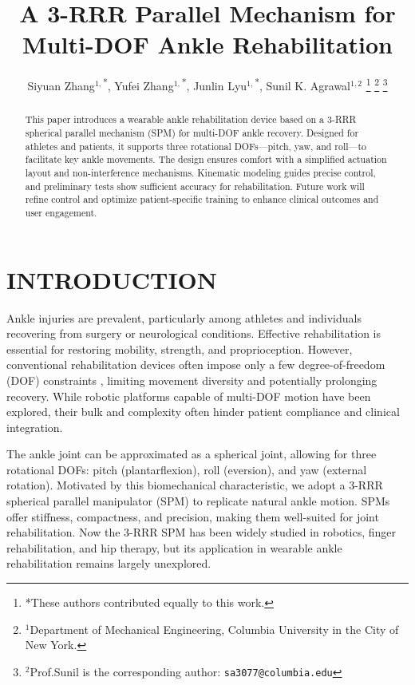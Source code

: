 \documentclass[letterpaper, 10 pt, conference]{ieeeconf}  %
\title{\LARGE \bf
A 3-RRR Parallel Mechanism for Multi-DOF Ankle Rehabilitation 
}
\author{Siyuan Zhang$^{1,}$\textsuperscript{*}, Yufei Zhang$^{1,}$\textsuperscript{*}, Junlin Lyu$^{1,}$\textsuperscript{*}, Sunil K. Agrawal$^{1, 2}$%
\thanks{*These authors contributed equally to this work.}%
\thanks{$^{1}$Department of Mechanical Engineering, 
        Columbia University in the City of New York.}%
\thanks{$^{2}$Prof.Sunil is the corresponding author: 
        {\tt\small sa3077@columbia.edu}}%
}
\begin{document}
\maketitle
\thispagestyle{empty}
\pagestyle{empty}


\begin{abstract}

This paper introduces a wearable ankle rehabilitation device based on a 3-RRR spherical parallel mechanism (SPM) for multi-DOF ankle recovery. Designed for athletes and patients, it supports three rotational DOFs—pitch, yaw, and roll—to facilitate key ankle movements. The design ensures comfort with a simplified actuation layout and non-interference mechanisms. Kinematic modeling guides precise control, and preliminary tests show sufficient accuracy for rehabilitation. Future work will refine control and optimize patient-specific training to enhance clinical outcomes and user engagement.

\end{abstract}


\section{INTRODUCTION}

Ankle injuries are prevalent, particularly among athletes and individuals recovering from surgery or neurological conditions. Effective rehabilitation is essential for restoring mobility, strength, and proprioception. However, conventional rehabilitation devices often impose only a few degree-of-freedom (DOF) constraints \cite{dong2021state}, limiting movement diversity and potentially prolonging recovery. While robotic platforms capable of multi-DOF motion have been explored, their bulk and complexity often hinder patient compliance and clinical integration.

The ankle joint can be approximated as a spherical joint, allowing for three rotational DOFs: pitch (plantarflexion), roll (eversion), and yaw (external rotation). Motivated by this biomechanical characteristic, we adopt a 3-RRR spherical parallel manipulator (SPM) to replicate natural ankle motion. SPMs offer stiffness, compactness, and precision, making them well-suited for joint rehabilitation. Now the 3-RRR SPM\cite{gosselin1989optimum} \cite{wu2019design} has been widely studied in robotics, finger rehabilitation\cite{he2021spindle}, and hip therapy\cite{sadeqi2017design}, but its application in wearable ankle rehabilitation remains largely unexplored.
\end{document}
